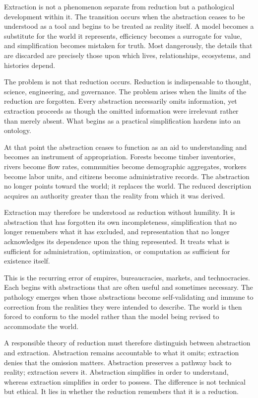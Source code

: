 \documentclass[12pt,letterpaper]{article}
\theoremstyle{remark}
\begin{document}
Extraction is not a phenomenon separate from reduction but a pathological development within it. The transition occurs when the abstraction ceases to be understood as a tool and begins to be treated as reality itself. A model becomes a substitute for the world it represents, efficiency becomes a surrogate for value, and simplification becomes mistaken for truth. Most dangerously, the details that are discarded are precisely those upon which lives, relationships, ecosystems, and histories depend.

The problem is not that reduction occurs. Reduction is indispensable to thought, science, engineering, and governance. The problem arises when the limits of the reduction are forgotten. Every abstraction necessarily omits information, yet extraction proceeds as though the omitted information were irrelevant rather than merely absent. What begins as a practical simplification hardens into an ontology.

At that point the abstraction ceases to function as an aid to understanding and becomes an instrument of appropriation. Forests become timber inventories, rivers become flow rates, communities become demographic aggregates, workers become labor units, and citizens become administrative records. The abstraction no longer points toward the world; it replaces the world. The reduced description acquires an authority greater than the reality from which it was derived.

Extraction may therefore be understood as reduction without humility. It is abstraction that has forgotten its own incompleteness, simplification that no longer remembers what it has excluded, and representation that no longer acknowledges its dependence upon the thing represented. It treats what is sufficient for administration, optimization, or computation as sufficient for existence itself.

This is the recurring error of empires, bureaucracies, markets, and technocracies. Each begins with abstractions that are often useful and sometimes necessary. The pathology emerges when those abstractions become self-validating and immune to correction from the realities they were intended to describe. The world is then forced to conform to the model rather than the model being revised to accommodate the world.

A responsible theory of reduction must therefore distinguish between abstraction and extraction. Abstraction remains accountable to what it omits; extraction denies that the omission matters. Abstraction preserves a pathway back to reality; extraction severs it. Abstraction simplifies in order to understand, whereas extraction simplifies in order to possess. The difference is not technical but ethical. It lies in whether the reduction remembers that it is a reduction.
\end{document}
